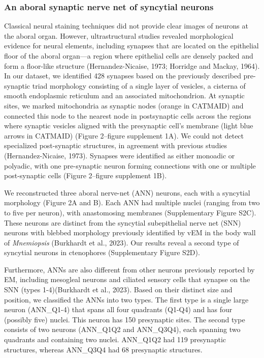 \documentclass[
  11pt,
]{article}
\begin{document}
\subsubsection{An aboral synaptic nerve net of syncytial
neurons}\label{an-aboral-synaptic-nerve-net-of-syncytial-neurons}

Classical neural staining techniques did not provide clear images of
neurons at the aboral organ. However, ultrastructural studies revealed
morphological evidence for neural elements, including synapses that are
located on the epithelial floor of the aboral organ---a region where
epithelial cells are densely packed and form a floor-like structure
(Hernandez-Nicaise, 1973; Horridge and Mackay, 1964). In our dataset, we
identified 428 synapses based on the previously described pre-synaptic
triad morphology consisting of a single layer of vesicles, a cisterna of
smooth endoplasmic reticulum and an associated mitochondrion. At
synaptic sites, we marked mitochondria as synaptic nodes (orange in
CATMAID) and connected this node to the nearest node in postsynaptic
cells across the regions where synaptic vesicles aligned with the
presynaptic cell's membrane (light blue arrows in CATMAID) (Figure
2--figure supplement 1A). We could not detect specialized post-synaptic
structures, in agreement with previous studies (Hernandez-Nicaise,
1973). Synapses were identified as either monoadic or polyadic, with one
pre-synaptic neuron forming connections with one or multiple
post-synaptic cells (Figure 2--figure supplement 1B).

We reconstructed three aboral nerve-net (ANN) neurons, each with a
syncytial morphology (Figure 2A and B). Each ANN had multiple nuclei
(ranging from two to five per neuron), with anastomosing membranes
(Supplementary Figure S2C). These neurons are distinct from the
syncytial subepithelial nerve net (SNN) neurons with blebbed morphology
previously identified by vEM in the body wall of \emph{Mnemiopsis}
(Burkhardt et al., 2023). Our results reveal a second type of syncytial
neurons in ctenophores (Supplementary Figure S2D).

Furthermore, ANNs are also different from other neurons previously
reported by EM, including mesogleal neurons and ciliated sensory cells
that synapse on the SNN (types 1-4)(Burkhardt et al., 2023). Based on
their distinct size and position, we classified the ANNs into two types.
The first type is a single large neuron (ANN\_Q1-4) that spans all four
quadrants (Q1-Q4) and has four (possibly five) nuclei. This neuron has
150 presynaptic sites. The second type consists of two neurons
(ANN\_Q1Q2 and ANN\_Q3Q4), each spanning two quadrants and containing
two nuclei. ANN\_Q1Q2 had 119 presynaptic structures, whereas ANN\_Q3Q4
had 68 presynaptic structures.
\end{document}
